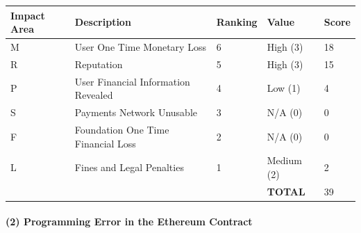 \documentclass[a4paper,12pt]{article} %
\begin{document}
{\begin{center}
\begin{tabular}{ | l | l | l | l | l |}
  \hline
  \textbf{Impact Area} & \textbf{Description} & \textbf{Ranking} & \textbf{Value} & \textbf{Score}
  \\ \hline
  M & User One Time Monetary Loss				& 6	& High (3)		& 18
  \\ \hline
  R & Reputation		& 5	& High (3)		& 15
  \\ \hline
  P & User Financial Information Revealed		& 4	& Low (1)		& 4
  \\ \hline
  S & Payments Network Unusable					& 3	& N/A (0)		& 0
  \\ \hline
  F & Foundation One Time Financial Loss	& 2	& N/A (0)		& 0
  \\ \hline
  L & Fines and Legal Penalties						& 1	& Medium (2)	& 2
  \\ \hline
  & & & \textbf{TOTAL} & 39
  \\ \hline
\end{tabular}
\end{center}
\label{tab:severityKeysStolenFromUserDevice}

\paragraph{(2) Programming Error in the Ethereum Contract }

}
\end{document}
